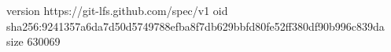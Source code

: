 version https://git-lfs.github.com/spec/v1
oid sha256:9241357a6da7d50d5749788efba8f7db629bbfd80fe52ff380df90b996c839da
size 630069
